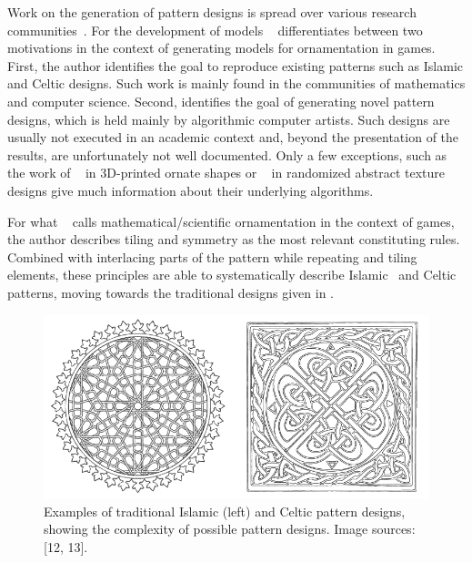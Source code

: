 Work on the generation of pattern designs is spread over various research communities~\cite{whitehead_2010_tpd}. For the development of models \citeauthor*{whitehead_2010_tpd}~\cite{whitehead_2010_tpd} differentiates between two motivations in the context of generating models for ornamentation in games. First, the author identifies the goal to reproduce existing patterns such as Islamic and Celtic designs. Such work is mainly found in the communities of mathematics and computer science. Second, \citeauthor*{whitehead_2010_tpd} identifies the goal of generating novel pattern designs, which is held mainly by algorithmic computer artists. Such designs are usually not executed in an academic context and, beyond the presentation of the results, are unfortunately not well documented. Only a few exceptions, such as the work of \citeauthor*{takayama_2016_med}~\cite{takayama_2016_med} in 3D-printed ornate shapes or \citeauthor*{alvarez_2019_ido}~\cite{alvarez_2019_ido} in randomized abstract texture designs give much information about their underlying algorithms.

For what \citeauthor*{whitehead_2010_tpd}~\cite{whitehead_2010_tpd} calls mathematical/scientific ornamentation in the context of games, the author describes tiling and symmetry as the most relevant constituting rules. Combined with interlacing parts of the pattern while repeating and tiling elements, these principles are able to systematically describe Islamic~\cite{ostromoukhov_1998_mtc} and Celtic~\cite{cromwell_1993_ckm} patterns, moving towards the traditional designs given in .

\begin{figure}
\centering
    \includegraphics[width=0.9\columnwidth]{figures/islamic_celtic_ornament_01.png}
    \caption[Islamic and Celtic pattern designs]{\label{fig:islamic_celtic_ornament}Examples of traditional Islamic (left) and Celtic pattern designs, showing the complexity of possible pattern designs. Image sources: [12, 13].} 
\end{figure}

